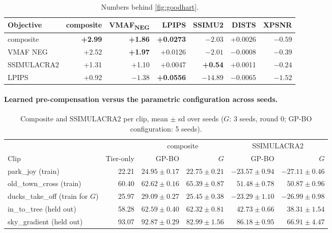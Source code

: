 \begin{table}[h]
  \centering
  \small
  \caption{Numbers behind \cref{fig:goodhart}.}
  \label{tab:goodhart}
  \begin{tabular}{@{}lrrrrrr@{}}
    \toprule
    Objective & composite & VMAF\textsubscript{NEG} & LPIPS & SSIMU2 & DISTS & XPSNR \\
    \midrule
    composite   & \textbf{+2.99} & \textbf{+1.86} & \textbf{+0.0273} & $-2.03$ & +0.0026 & $-0.59$ \\
    VMAF NEG    & +2.52 & \textbf{+1.97} & +0.0126 & $-2.01$ & $-0.0008$ & $-0.39$ \\
    SSIMULACRA2 & +1.31 & +1.10 & +0.0047 & \textbf{+0.54} & +0.0011 & $-0.24$ \\
    LPIPS       & +0.92 & $-1.38$ & \textbf{+0.0556} & $-14.89$ & $-0.0065$ & $-1.52$ \\
    \bottomrule
  \end{tabular}
\end{table}

\paragraph{Learned pre-compensation versus the parametric configuration across seeds.}

\begin{table}[h]
  \centering
  \small
  \caption{Composite and SSIMULACRA2 per clip, mean $\pm$ sd over seeds ($G$: 3 seeds, round 0;
  GP-BO configuration: 5 seeds).}
  \label{tab:g-vs-theta}
  \setlength{\tabcolsep}{4pt}
  \begin{tabular}{@{}lrrrrr@{}}
    \toprule
    & & \multicolumn{2}{c}{composite} & \multicolumn{2}{c}{SSIMULACRA2} \\
    \cmidrule(lr){3-4}\cmidrule(lr){5-6}
    Clip & Tier-only & GP-BO & $G$ & GP-BO & $G$ \\
    \midrule
    park\_joy (train)          & 22.21 & $24.95\pm0.17$ & $22.75\pm0.21$ & $-23.57\pm0.94$ & $-27.11\pm0.46$ \\
    old\_town\_cross (train)   & 60.40 & $62.62\pm0.16$ & $65.39\pm0.87$ & $51.48\pm0.78$ & $50.87\pm0.96$ \\
    ducks\_take\_off (train for $G$) & 25.97 & $29.09\pm0.27$ & $25.45\pm0.38$ & $-23.29\pm1.10$ & $-26.99\pm0.98$ \\
    in\_to\_tree (held out)    & 58.28 & $62.59\pm0.40$ & $62.32\pm0.81$ & $42.73\pm0.66$ & $38.31\pm1.54$ \\
    sky\_gradient (held out)   & 93.07 & $92.87\pm0.29$ & $82.99\pm1.56$ & $86.18\pm0.95$ & $66.91\pm4.47$ \\
    \bottomrule
  \end{tabular}
\end{table}
